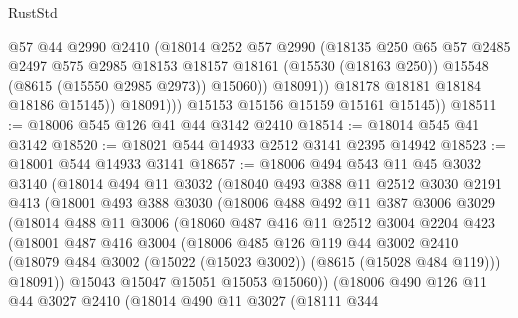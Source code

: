 \begin{lexlean}{RustStd}
\begin{coremodule}
                      @57
                      @44
                      @2990
                      @2410
                      (@18014
                        @252
                        @57
                        @2990
                        (@18135
                          @250
                          @65
                          @57
                          @2485
                          @2497
                          @575
                          @2985
                          @18153
                          @18157
                          @18161
                          (@15530 (@18163 @250))
                          @15548
                          (@8615 (@15550 @2985 @2973))
                          @15060))
                      @18091))
                  @18178
                  @18181
                  @18184
                  @18186
                  @15145))
              @18091)))
        @15153
        @15156
        @15159
        @15161
        @15145))
@18511 := @18006 @545 @126 @41 @44 @3142 @2410
@18514 := @18014 @545 @41 @3142
@18520 := @18021 @544 @14933 @2512 @3141 @2395 @14942
@18523 := @18001 @544 @14933 @3141
@18657 := @18006
    @494
    @543
    @11
    @45
    @3032
    @3140
    (@18014
      @494
      @11
      @3032
      (@18040
        @493
        @388
        @11
        @2512
        @3030
        @2191
        @413
        (@18001
          @493
          @388
          @3030
          (@18006
            @488
            @492
            @11
            @387
            @3006
            @3029
            (@18014
              @488
              @11
              @3006
              (@18060
                @487
                @416
                @11
                @2512
                @3004
                @2204
                @423
                (@18001
                  @487
                  @416
                  @3004
                  (@18006
                    @485
                    @126
                    @119
                    @44
                    @3002
                    @2410
                    (@18079 @484 @3002 (@15022 (@15023 @3002)) (@8615 (@15028 @484 @119)))
                    @18091))
                @15043
                @15047
                @15051
                @15053
                @15060))
            (@18006
              @490
              @126
              @11
              @44
              @3027
              @2410
              (@18014
                @490
                @11
                @3027
                (@18111
                  @344

\end{coremodule}
\end{lexlean}
